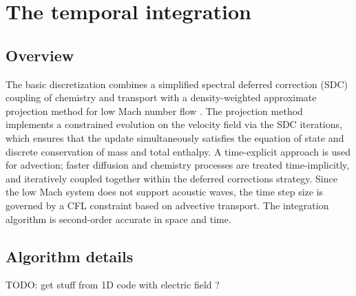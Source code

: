 \section{The \pelelm  \; temporal integration}
\subsection{Overview}
The basic discretization combines a simplified spectral deferred correction (SDC) coupling of chemistry and transport \cite{LMC_SDC} with a density-weighted approximate projection method for low Mach number flow \cite{DayBell:2000}.  The projection method implements a constrained evolution on the velocity field via the SDC iterations, which ensures that the update simultaneously satisfies the  equation of state and discrete conservation of mass and total enthalpy.
A time-explicit approach is used for advection; faster diffusion and chemistry processes are treated time-implicitly, and iteratively coupled together within the deferred corrections strategy. Since the low Mach system does not support acoustic waves, the time step size is governed by a CFL constraint based on advective transport.
The integration algorithm is second-order accurate in space and time.


\subsection{Algorithm details}
\label{AlgoDetails}
TODO: get stuff from 1D code with electric field ?

